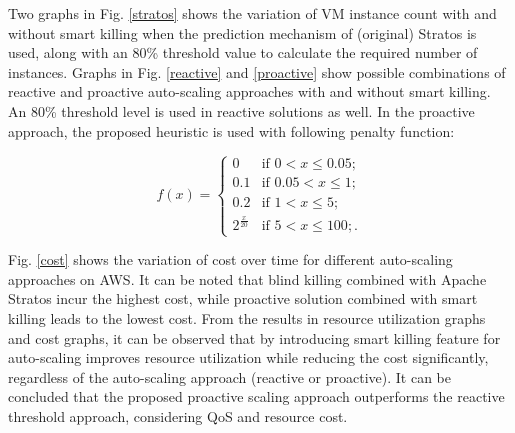 Two graphs in Fig. \ref{stratos} shows the variation of VM instance count with and without smart killing when the prediction mechanism of (original) Stratos is used, along with an 80\% threshold value to calculate the required number of instances. Graphs in Fig. \ref{reactive} and \ref{proactive} show possible combinations of reactive and proactive auto-scaling approaches with and without smart killing. An 80\% threshold level is used in reactive solutions as well. In the proactive approach, the proposed heuristic is used with following penalty function:

$$f(x) = \begin{cases} 
0 & \text{if $0 < x \le 0.05$}; \\
0.1 & \text{if $0.05 < x \le 1$}; \\
0.2 & \text{if $1 < x \le 5$};\\
2^{\frac{x}{20}} & \text{if $5 < x \le 100$};.\end{cases} $$

Fig. \ref{cost} shows the variation of cost over time for different auto-scaling approaches on AWS. It can be noted that blind killing combined with Apache Stratos incur the highest cost, while proactive solution combined with smart killing leads to the lowest cost. From the results in resource utilization graphs and cost graphs, it can be observed that by introducing smart killing feature for auto-scaling improves resource utilization while reducing the cost significantly, regardless of the auto-scaling approach (reactive or proactive). It can be concluded that the proposed proactive scaling approach outperforms the reactive threshold approach, considering QoS and resource cost.